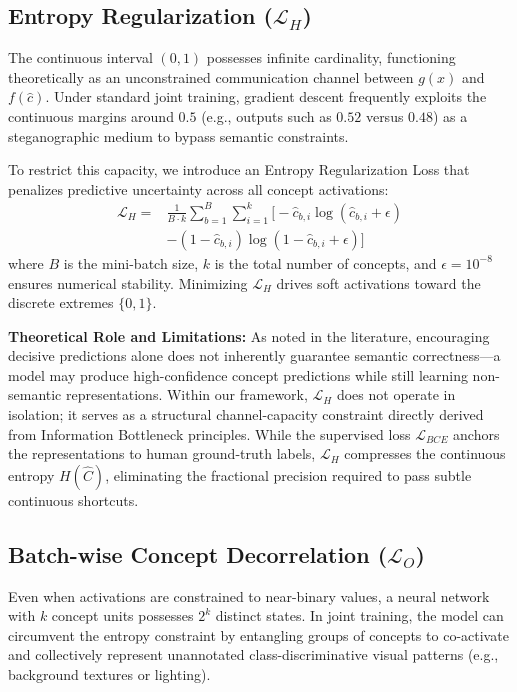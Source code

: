 \documentclass[times,twocolumn,final]{elsarticle}
\begin{document}
\subsection{Entropy Regularization ($\mathcal{L}_{H}$)}
The continuous interval $(0, 1)$ possesses infinite cardinality, functioning theoretically as an unconstrained communication channel between $g(x)$ and $f(\hat{c})$. Under standard joint training, gradient descent frequently exploits the continuous margins around $0.5$ (e.g., outputs such as $0.52$ versus $0.48$) as a steganographic medium to bypass semantic constraints. 

To restrict this capacity, we introduce an Entropy Regularization Loss that penalizes predictive uncertainty across all concept activations:
\begin{align}
    \mathcal{L}_{H} =&\frac{1}{B \cdot k} \sum_{b=1}^{B} \sum_{i=1}^{k} \Big[ - \hat{c}_{b,i} \log(\hat{c}_{b,i} + \epsilon) \nonumber \\
    &- (1 - \hat{c}_{b,i}) \log(1 - \hat{c}_{b,i} + \epsilon) \Big]
\end{align}
where $B$ is the mini-batch size, $k$ is the total number of concepts, and $\epsilon = 10^{-8}$ ensures numerical stability. Minimizing $\mathcal{L}_{H}$ drives soft activations toward the discrete extremes $\{0, 1\}$. 

\noindent\textbf{Theoretical Role and Limitations:} As noted in the literature, encouraging decisive predictions alone does not inherently guarantee semantic correctness---a model may produce high-confidence concept predictions while still learning non-semantic representations. Within our framework, $\mathcal{L}_{H}$ does not operate in isolation; it serves as a structural channel-capacity constraint directly derived from Information Bottleneck principles. While the supervised loss $\mathcal{L}_{BCE}$ anchors the representations to human ground-truth labels, $\mathcal{L}_{H}$ compresses the continuous entropy $H(\hat{C})$, eliminating the fractional precision required to pass subtle continuous shortcuts.

\subsection{Batch-wise Concept Decorrelation ($\mathcal{L}_{O}$)}
Even when activations are constrained to near-binary values, a neural network with $k$ concept units possesses $2^k$ distinct states. In joint training, the model can circumvent the entropy constraint by entangling groups of concepts to co-activate and collectively represent unannotated class-discriminative visual patterns (e.g., background textures or lighting).
\end{document}
